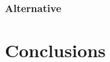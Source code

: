 \documentclass[12pt]{article}
\begin{document}
\subsubsection{Alternative}


\section{Conclusions}
\end{document}
